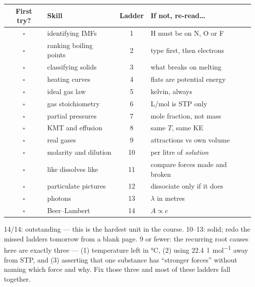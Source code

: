 \documentclass{apchem-worksheet}
\begin{document}
\renewcommand{\arraystretch}{1.30}
\noindent\begin{tabular}{@{}c p{6.0cm} c >{\raggedright\arraybackslash}p{4.9cm}@{}}
\toprule
\textbf{First try?} & \textbf{Skill} & \textbf{Ladder} &
  \textbf{If not, re-read\ldots}\\
\midrule
$\square$ & identifying IMFs & 1 & H must be on N, O or F \\
$\square$ & ranking boiling points & 2 & type first, then electrons \\
$\square$ & classifying solids & 3 & what breaks on melting \\
$\square$ & heating curves & 4 & flats are potential energy \\
$\square$ & ideal gas law & 5 & kelvin, always \\
$\square$ & gas stoichiometry & 6 & 22.4 L/mol is STP only \\
$\square$ & partial pressures & 7 & mole fraction, not mass \\
$\square$ & KMT and effusion & 8 & same $T$, same KE \\
$\square$ & real gases & 9 & attractions vs own volume \\
$\square$ & molarity and dilution & 10 & per litre of \emph{solution} \\
$\square$ & like dissolves like & 11 & compare forces made and broken \\
$\square$ & particulate pictures & 12 & dissociate only if it does \\
$\square$ & photons & 13 & $\lambda$ in metres \\
$\square$ & Beer--Lambert & 14 & $A \propto c$ \\
\bottomrule
\end{tabular}

\begin{apcnote}
14/14: outstanding --- this is the hardest unit in the course. 10--13:
solid; redo the missed ladders tomorrow from a blank page. 9 or fewer: the
recurring root causes here are exactly three --- (1) temperature left in
\si{\celsius}, (2) using \SI{22.4}{\litre\per\mole} away from STP, and
(3) asserting that one substance has ``stronger forces'' without naming
which force and why. Fix those three and most of these ladders fall
together.
\end{apcnote}
\end{document}
